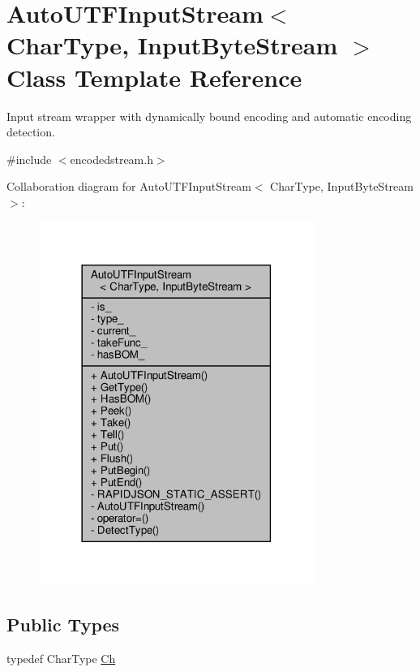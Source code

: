 \hypertarget{classAutoUTFInputStream}{}\section{Auto\+U\+T\+F\+Input\+Stream$<$ Char\+Type, Input\+Byte\+Stream $>$ Class Template Reference}
\label{classAutoUTFInputStream}


Input stream wrapper with dynamically bound encoding and automatic encoding detection.  




{\ttfamily \#include $<$encodedstream.\+h$>$}



Collaboration diagram for Auto\+U\+T\+F\+Input\+Stream$<$ Char\+Type, Input\+Byte\+Stream $>$\+:
\nopagebreak
\begin{figure}[H]
\begin{center}
\leavevmode
\includegraphics[width=254pt]{classAutoUTFInputStream__coll__graph}
\end{center}
\end{figure}
\subsection*{Public Types}
\begin{DoxyCompactItemize}
\item 
typedef Char\+Type \hyperlink{classAutoUTFInputStream_a3bb3eb46f2c20404a7ac21963cfe348f}{Ch}
\end{DoxyCompactItemize}
